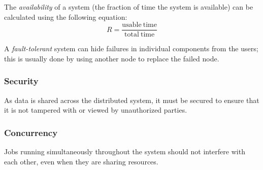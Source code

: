 The \textit{availability} of a system (the fraction of time the system is available) can be calculated using the following equation:
\[ R = \frac{\mathrm{usable\ time}}{\mathrm{total\ time}} \]

A \textit{fault-tolerant} system can hide failures in individual components from the users; this is usually done by using another node to replace the failed node.

\subsubsection{Security}
As data is shared across the distributed system, it must be secured to ensure that it is not tampered with or viewed by unauthorized parties.

\subsubsection{Concurrency}
Jobs running simultaneously throughout the system should not interfere with each other, even when they are sharing resources.
